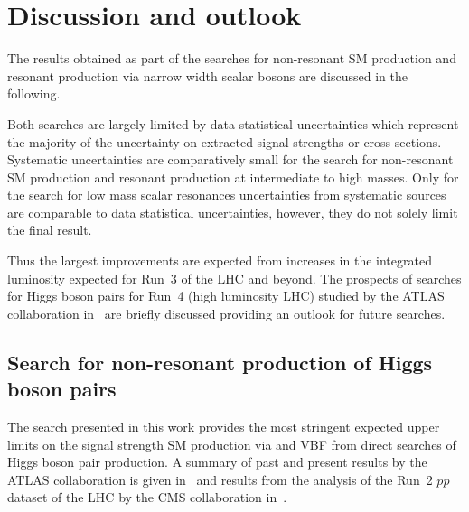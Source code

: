 \section{Discussion and outlook}%
\label{sec:result_discussion}

The results obtained as part of the searches for non-resonant SM \HH
production and resonant production via narrow width scalar bosons are
discussed in the following.

Both searches are largely limited by data statistical uncertainties
which represent the majority of the uncertainty on extracted signal
strengths or cross sections. Systematic uncertainties are
comparatively small for the search for non-resonant SM \HH production
and resonant production at intermediate to high masses. Only for the
search for low mass scalar resonances uncertainties from systematic
sources are comparable to data statistical uncertainties, however,
they do not solely limit the final result.

Thus the largest improvements are expected from increases in the
integrated luminosity expected for Run~3 of the LHC and beyond. The
prospects of searches for Higgs boson pairs for Run~4 (high luminosity
LHC) studied by the ATLAS collaboration
in~\cite{ATL-PHYS-PUB-2021-044,ATL-PHYS-PUB-2022-005} are briefly
discussed providing an outlook for future searches.


\subsection{Search for non-resonant production of Higgs boson pairs}

The search presented in this work provides the most stringent expected
upper limits on the signal strength SM \HH production via \ggF and VBF
from direct searches of Higgs boson pair production. A summary of past
and present results by the ATLAS collaboration is given
in~ and results from the analysis of
the Run~2 $pp$ dataset of the LHC by the CMS collaboration
in~.

